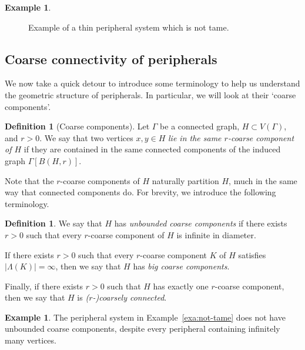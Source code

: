 \documentclass[11pt,a4paper]{amsart}
\theoremstyle{definition}
\newtheorem{definition}[theorem]{Definition}
\newtheorem{example}[theorem]{Example}
\begin{document}
\begin{example}
\begin{figure}[h]
\begin{tikzpicture}[x=0.75pt,y=0.75pt,yscale=-1,xscale=1]
\end{tikzpicture}

        \caption{Example of a  thin peripheral system which is not tame.}
        \label{fig:nontameexample}
    \end{figure}
\end{example}


\subsection{Coarse connectivity of peripherals}

We now take a quick detour to introduce some terminology to help us understand the geometric structure of peripherals. In particular, we will look at their `coarse components'. 

\begin{definition}[Coarse components]
    Let $\Gamma$ be a connected graph, $H \subset V(\Gamma)$, and $r > 0$. We say that two vertices $x,y\in H$ \emph{lie in the same $r$-coarse component of $H$} if they are contained in the same connected components of the induced graph $\Gamma[B(H,r)]$. 
\end{definition}

Note that the $r$-coarse components of $H$ naturally partition $H$, much in the same way that connected components do.
For brevity, we introduce the following terminology.

\begin{definition}
    We say that $H$ has \emph{unbounded coarse components} if there exists $r > 0$ such that every $r$-coarse component of $H$ is infinite in diameter. 

    If there exists $r > 0$ such that every $r$-coarse component $K$ of $H$ satisfies $|\Lambda(K)| = \infty$, then we say that $H$ has \emph{big coarse components}. 

    Finally, if there exists $r > 0$ such that $H$ has exactly one $r$-coarse component, then we say that $H$ is \emph{($r$-)coarsely connected}. 
\end{definition}

\begin{example}
    The peripheral system in Example~\ref{exa:not-tame} does not have unbounded coarse components, despite every peripheral containing infinitely many vertices. 
\end{example}


\end{document}
